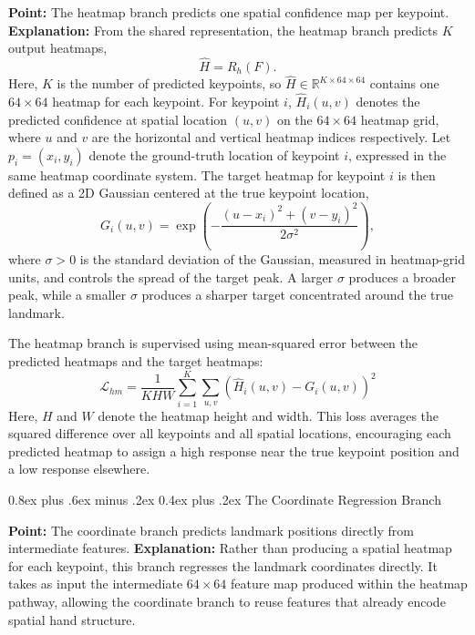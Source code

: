 \documentclass[10pt,letterpaper]{article}
\makeatletter
\renewcommand\subsubsection{\@startsection{subsubsection}{3}{\z@}%
  {0.8ex plus .6ex minus .2ex}%
  {0.4ex plus .2ex}%
  {\normalfont\small\itshape}}
\makeatother
\begin{document}
\noindent\textbf{Point:} The heatmap branch predicts one spatial confidence map per keypoint.  
\textbf{Explanation:} From the shared representation, the heatmap branch predicts \(K\) output heatmaps,
\begin{equation}
\hat{H} = R_h(F).
\label{eq:heatmap-output}
\end{equation}
Here, \(K\) is the number of predicted keypoints, so \(\hat{H} \in \mathbb{R}^{K \times 64 \times 64}\) contains one \(64 \times 64\) heatmap for each keypoint. For keypoint \(i\), \(\hat{H}_i(u,v)\) denotes the predicted confidence at spatial location \((u,v)\) on the \(64 \times 64\) heatmap grid, where \(u\) and \(v\) are the horizontal and vertical heatmap indices respectively. Let \(p_i = (x_i, y_i)\) denote the ground-truth location of keypoint \(i\), expressed in the same heatmap coordinate system. The target heatmap for keypoint \(i\) is then defined as a 2D Gaussian centered at the true keypoint location,
\begin{equation}
G_i(u,v) = \exp\left(
-\frac{(u-x_i)^2 + (v-y_i)^2}{2\sigma^2}
\right),
\label{eq:gaussian-target}
\end{equation}
where \(\sigma > 0\) is the standard deviation of the Gaussian, measured in heatmap-grid units, and controls the spread of the target peak. A larger \(\sigma\) produces a broader peak, while a smaller \(\sigma\) produces a sharper target concentrated around the true landmark.

The heatmap branch is supervised using mean-squared error between the predicted heatmaps and the target heatmaps:
\begin{equation}
\mathcal{L}_{hm}
=
\frac{1}{KHW}
\sum_{i=1}^{K}
\sum_{u,v}
\left(\hat{H}_i(u,v) - G_i(u,v)\right)^2
\label{eq:heatmap-loss}
\end{equation}
Here, \(H\) and \(W\) denote the heatmap height and width. This loss averages the squared difference over all keypoints and all spatial locations, encouraging each predicted heatmap to assign a high response near the true keypoint position and a low response elsewhere. 

\subsubsection{The Coordinate Regression Branch}

\noindent\textbf{Point:} The coordinate branch predicts landmark positions directly from intermediate features.  
\textbf{Explanation:} Rather than producing a spatial heatmap for each keypoint, this branch regresses the landmark coordinates directly. It takes as input the intermediate \(64 \times 64\) feature map produced within the heatmap pathway, allowing the coordinate branch to reuse features that already encode spatial hand structure.
\end{document}
